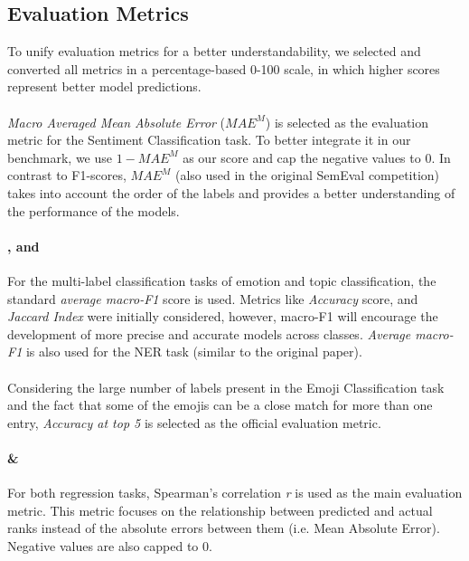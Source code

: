 \subsection{Evaluation Metrics}
\label{sec:evaluation_metrics}
To unify evaluation metrics for a better understandability, we selected and converted all metrics in a percentage-based 0-100 scale, in which higher scores represent better model predictions.

\paragraph{{\TweetSentiment}} \textit{Macro Averaged Mean Absolute Error} ($MAE^M$) \cite{baccianella2009evaluation} is selected as the evaluation metric for the Sentiment Classification task. To better integrate it in our benchmark, we use $1 - MAE^M$ as our score and cap the negative values to 0. In contrast to F1-scores, $MAE^M$ (also used in the original SemEval competition) takes into account the order of the labels and provides a better understanding of the performance of the models. 

\paragraph{{\TweetEmotion}, {\TweetTopic} and {\TweetNER}} For the multi-label classification tasks of emotion and topic classification, the standard \textit{average macro-F1} score is used. Metrics like \textit{Accuracy} score, and \textit{Jaccard Index} were initially considered, however, macro-F1 will encourage the development of more precise and accurate models across classes. \textit{Average macro-F1} is also used for the NER task (similar to the {\TweetNER} original paper).

\paragraph{{\TweetEmoji}} Considering the large number of labels present in the Emoji Classification task and  the fact that some of the emojis can be a close match for more than one entry, \textit{Accuracy at top 5} is selected as the official evaluation metric. 

\paragraph{{\TweetSimilarity} \& {\TweetIntimacy}} For both regression tasks, Spearman's correlation \textit{r} is used as the main evaluation metric. This metric focuses on the relationship between predicted and actual ranks instead of the absolute errors between them (i.e. Mean Absolute Error). Negative values are also capped to 0.


